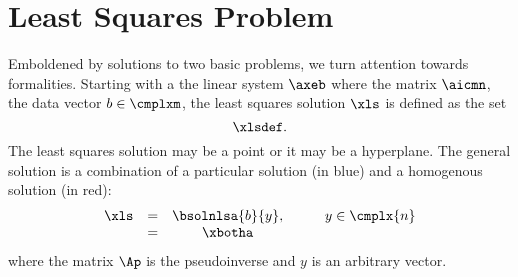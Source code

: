\section{\label{sec:lsp}Least Squares Problem}  %
Emboldened by solutions to two basic problems, we turn attention towards formalities. Starting with a the linear system $\axeb$ where the matrix $\aicmn$, the data vector $b\in\cmplxm$, the least squares solution $\xls$ is defined as the set
  \begin{equation}   %
    \xlsdef .
    \label{eq:xlsdef}
  \end{equation}
The least squares solution may be a point or it may be a hyperplane. The general solution is a combination of a particular solution (in blue) and a homogenous solution (in red):
  \begin{equation}   %
   \begin{array}{cccccl}
     \xls 
       & = & \bsolnlsa{b}{y}, & \qquad y \in \cmplx{n} \\
       & = & \xbotha
    \label{eq:general soln}
   \end{array}
  \end{equation}
where the matrix $\Ap$ is the pseudoinverse and $y$ is an arbitrary vector.


\endinput